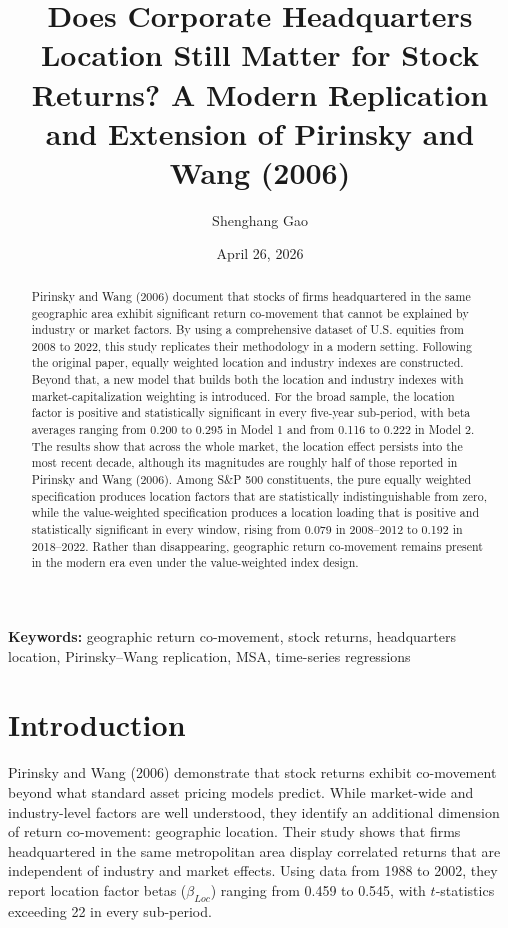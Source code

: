 \documentclass[
  12pt,
]{article}
\title{Does Corporate Headquarters Location Still Matter for Stock
Returns? A Modern Replication and Extension of Pirinsky and Wang (2006)}
\author{Shenghang Gao}
\date{April 26, 2026}
\begin{document}
\maketitle

\begin{abstract}
Pirinsky and Wang (2006) document that stocks of firms headquartered in the same geographic area exhibit significant return co-movement that cannot be explained by industry or market factors. By using a comprehensive dataset of U.S. equities from 2008 to 2022, this study replicates their methodology in a modern setting. Following the original paper, equally weighted location and industry indexes are constructed. Beyond that, a new model that builds both the location and industry indexes with market-capitalization weighting is introduced. For the broad sample, the location factor is positive and statistically significant in every five-year sub-period, with beta averages ranging from 0.200 to 0.295 in Model 1 and from 0.116 to 0.222 in Model 2. The results show that across the whole market, the location effect persists into the most recent decade, although its magnitudes are roughly half of those reported in Pirinsky and Wang (2006). Among S\&P 500 constituents, the pure equally weighted specification produces location factors that are statistically indistinguishable from zero, while the value-weighted specification produces a location loading that is positive and statistically significant in every window, rising from 0.079 in 2008--2012 to 0.192 in 2018--2022. Rather than disappearing, geographic return co-movement remains present in the modern era even under the value-weighted index design.
\end{abstract}

\noindent \textbf{Keywords:} geographic return co-movement, stock
returns, headquarters location, Pirinsky--Wang replication, MSA,
time-series regressions

\newpage

\section{Introduction}\label{introduction}

Pirinsky and Wang (2006) demonstrate that stock returns exhibit
co-movement beyond what standard asset pricing models predict. While
market-wide and industry-level factors are well understood, they
identify an additional dimension of return co-movement: geographic
location. Their study shows that firms headquartered in the same
metropolitan area display correlated returns that are independent of
industry and market effects. Using data from 1988 to 2002, they report
location factor betas (\(\beta_{Loc}\)) ranging from 0.459 to 0.545,
with \(t\)-statistics exceeding 22 in every sub-period.
\end{document}

